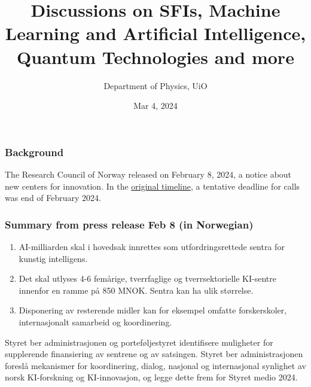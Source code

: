 \documentclass{beamer}
\begin{document}

\newcommand{\exercisesection}[1]{\subsection*{#1}}







\title{Discussions on SFIs, Machine Learning and Artificial Intelligence, Quantum Technologies and more}


\author{Department of Physics, UiO\inst{}}
\institute{}

\date{Mar 4, 2024
}

\begin{frame}
\titlepage
\end{frame}

\begin{frame}
\frametitle{Background}

The Research Council of Norway released on February 8, 2024, a notice about new centers for innovation.
In the \href{{https://www.forskningsradet.no/forskningspolitikk-strategi/ltp/kunstig-intelligens/}}{original timeline}, a tentative deadline for calls was end of February 2024.
\end{frame}

\begin{frame}
\frametitle{Summary from press release Feb 8 (in Norwegian)}

\begin{enumerate}
\item AI-milliarden skal i hovedsak innrettes som utfordringsrettede sentra for kunstig intelligens.

\item Det skal utlyses 4-6 femårige, tverrfaglige og tverrsektorielle KI-sentre innenfor en ramme på 850 MNOK. Sentra kan ha ulik størrelse.

\item Disponering av resterende midler kan for eksempel omfatte forskerskoler, internasjonalt samarbeid og koordinering.
\end{enumerate}

\noindent
Styret ber administrasjonen og porteføljestyret identifisere muligheter for supplerende finansiering av sentrene og av satsingen.
Styret ber administrasjonen foreslå mekanismer for koordinering, dialog, nasjonal og internasjonal synlighet av norsk KI-forskning og KI-innovasjon, og legge dette frem for Styret medio 2024.
\end{frame}
\end{document}
